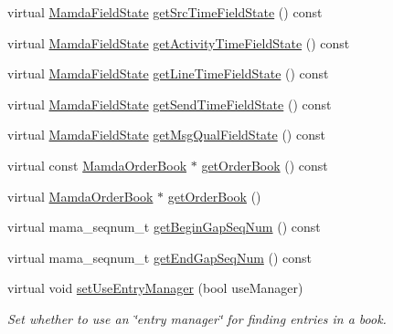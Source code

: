 \begin{CompactItemize}
virtual \hyperlink{namespaceWombat_93aac974f2ab713554fd12a1fa3b7d2a}{Mamda\-Field\-State} \hyperlink{classWombat_1_1MamdaOrderBookListener_cd480d3e1ecf4c3f2d726b907f4b34c3}{get\-Src\-Time\-Field\-State} () const 
\item 
virtual \hyperlink{namespaceWombat_93aac974f2ab713554fd12a1fa3b7d2a}{Mamda\-Field\-State} \hyperlink{classWombat_1_1MamdaOrderBookListener_d1aa4977550c9b83e091509faa735d76}{get\-Activity\-Time\-Field\-State} () const 
\item 
virtual \hyperlink{namespaceWombat_93aac974f2ab713554fd12a1fa3b7d2a}{Mamda\-Field\-State} \hyperlink{classWombat_1_1MamdaOrderBookListener_967aa4033993bc70c16d95d26283da54}{get\-Line\-Time\-Field\-State} () const 
\item 
virtual \hyperlink{namespaceWombat_93aac974f2ab713554fd12a1fa3b7d2a}{Mamda\-Field\-State} \hyperlink{classWombat_1_1MamdaOrderBookListener_881995554b016618dc16f9a9e15be90d}{get\-Send\-Time\-Field\-State} () const 
\item 
virtual \hyperlink{namespaceWombat_93aac974f2ab713554fd12a1fa3b7d2a}{Mamda\-Field\-State} \hyperlink{classWombat_1_1MamdaOrderBookListener_0516e60cecd086e30781592f16110196}{get\-Msg\-Qual\-Field\-State} () const 
\item 
virtual const \hyperlink{classWombat_1_1MamdaOrderBook}{Mamda\-Order\-Book} $\ast$ \hyperlink{classWombat_1_1MamdaOrderBookListener_882be50b668154aed7f170dbb2f47d34}{get\-Order\-Book} () const 
\item 
virtual \hyperlink{classWombat_1_1MamdaOrderBook}{Mamda\-Order\-Book} $\ast$ \hyperlink{classWombat_1_1MamdaOrderBookListener_06ed6e6af962b6bee11d49bdc0c451dd}{get\-Order\-Book} ()
\item 
virtual mama\_\-seqnum\_\-t \hyperlink{classWombat_1_1MamdaOrderBookListener_967ffb9c9c1cd0def13fefed413ad554}{get\-Begin\-Gap\-Seq\-Num} () const 
\item 
virtual mama\_\-seqnum\_\-t \hyperlink{classWombat_1_1MamdaOrderBookListener_c53f97e362bed788ac8daf00c2c8daf3}{get\-End\-Gap\-Seq\-Num} () const 
\item 
virtual void \hyperlink{classWombat_1_1MamdaOrderBookListener_428fd0fee7ccd623c45333d7787b6f70}{set\-Use\-Entry\-Manager} (bool use\-Manager)
\begin{CompactList}\small\item\em Set whether to use an \char`\"{}entry manager\char`\"{} for finding entries in a book. \item\end{CompactList}\item 

\end{CompactItemize}
